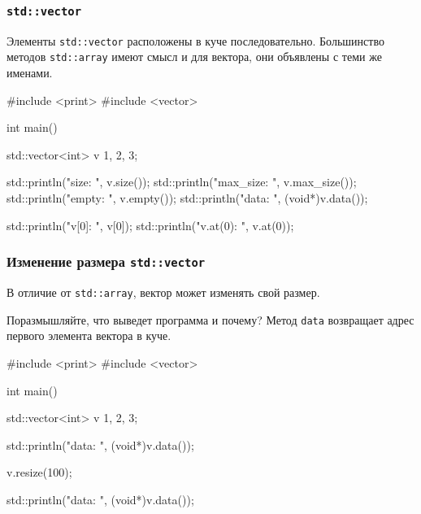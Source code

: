 \documentclass[compress, 8pt, aspectratio=169]{beamer}
\begin{document}
  \begin{frame}[fragile]

    \frametitle{\texttt{std::vector}}

    Элементы \texttt{std::vector}\footnotemark{} расположены в куче последовательно.
    Большинство методов \texttt{std::array} имеют смысл и для вектора,
    они объявлены с теми же именами.


    \begin{mycppinplacelisting}
#include <print>
#include <vector>

int main() {
    std::vector<int> v {1, 2, 3};

    std::println("size: {}", v.size());
    std::println("max_size: {}", v.max_size());
    std::println("empty: {}", v.empty());
    std::println("data: {}", (void*){v.data()});

    std::println("v[0]: {}", v[0]);
    std::println("v.at(0): {}", v.at(0));
}
    \end{mycppinplacelisting}

  \end{frame}

  \begin{frame}[fragile]

    \frametitle{Изменение размера \texttt{std::vector}}

    В отличие от \texttt{std::array}, вектор может изменять
    свой размер.

    \begin{task}
      Поразмышляйте, что выведет программа и почему?
      Метод \texttt{data} возвращает адрес первого элемента
      вектора в куче.
    \end{task}

    \begin{mycppinplacelisting}
#include <print>
#include <vector>

int main() {
    std::vector<int> v {1, 2, 3};

    std::println("data: {}", (void*){v.data()});

    v.resize(100);

    std::println("data: {}", (void*){v.data()});
}
    \end{mycppinplacelisting}

  \end{frame}
\end{document}

